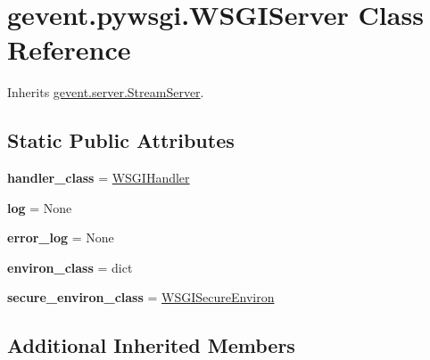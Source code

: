 \hypertarget{classgevent_1_1pywsgi_1_1_w_s_g_i_server}{}\section{gevent.\+pywsgi.\+W\+S\+G\+I\+Server Class Reference}
\label{classgevent_1_1pywsgi_1_1_w_s_g_i_server}


Inherits \hyperlink{classgevent_1_1server_1_1_stream_server}{gevent.\+server.\+Stream\+Server}.

\subsection*{Static Public Attributes}
\begin{DoxyCompactItemize}
\item 
\mbox{\label{classgevent_1_1pywsgi_1_1_w_s_g_i_server_a352fce0fdda738b039ecead431661712}} 
{\bfseries handler\+\_\+class} = \hyperlink{classgevent_1_1pywsgi_1_1_w_s_g_i_handler}{W\+S\+G\+I\+Handler}
\item 
\mbox{\label{classgevent_1_1pywsgi_1_1_w_s_g_i_server_aa72fb3d519201d7cd48bbe7ecc1023be}} 
{\bfseries log} = None
\item 
\mbox{\label{classgevent_1_1pywsgi_1_1_w_s_g_i_server_a6ed7f2f1167e28476b2048ad2c879aa1}} 
{\bfseries error\+\_\+log} = None
\item 
\mbox{\label{classgevent_1_1pywsgi_1_1_w_s_g_i_server_a49b0204caeec761bfd06ddf47172d520}} 
{\bfseries environ\+\_\+class} = dict
\item 
\mbox{\label{classgevent_1_1pywsgi_1_1_w_s_g_i_server_ab4b4da34b70aae9df4045a59b89e1482}} 
{\bfseries secure\+\_\+environ\+\_\+class} = \hyperlink{classgevent_1_1pywsgi_1_1_w_s_g_i_secure_environ}{W\+S\+G\+I\+Secure\+Environ}
\end{DoxyCompactItemize}
\subsection*{Additional Inherited Members}


